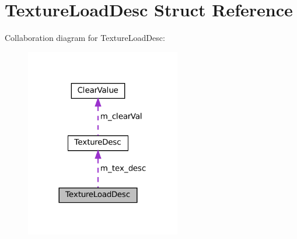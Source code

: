 \hypertarget{structTextureLoadDesc}{}\section{Texture\+Load\+Desc Struct Reference}
\label{structTextureLoadDesc}


Collaboration diagram for Texture\+Load\+Desc\+:
\nopagebreak
\begin{figure}[H]
\begin{center}
\leavevmode
\includegraphics[width=192pt]{structTextureLoadDesc__coll__graph}
\end{center}
\end{figure}
